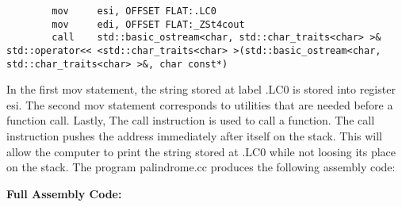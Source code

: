 \documentclass{article}
\theoremstyle{theorem}
\theoremstyle{definition}
\theoremstyle{remark}
\begin{document}
\begin{lstlisting}
        mov     esi, OFFSET FLAT:.LC0
        mov     edi, OFFSET FLAT:_ZSt4cout
        call    std::basic_ostream<char, std::char_traits<char> >& std::operator<< <std::char_traits<char> >(std::basic_ostream<char, std::char_traits<char> >&, char const*)
\end{lstlisting} 

In the first mov statement, the string stored at label .LC0 is stored into register esi. The second mov statement corresponds to utilities that are needed before a function call. Lastly, The call instruction is used to call a function. The call instruction pushes the address immediately after itself on the stack. This will allow the computer to print the string stored at .LC0 while not loosing its place on the stack. The program palindrome.cc produces the following assembly code:
        
\textbf{Full Assembly Code:}
\end{document}
